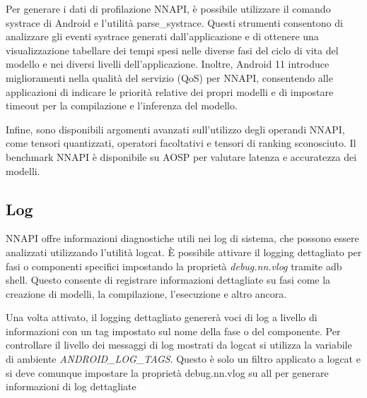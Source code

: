 Per generare i dati di profilazione NNAPI, è possibile utilizzare il comando systrace di Android e l'utilità parse\_systrace. Questi strumenti consentono di analizzare gli eventi systrace generati dall'applicazione e di ottenere
una visualizzazione tabellare dei tempi spesi nelle diverse fasi del ciclo di vita del modello e nei diversi livelli dell'applicazione.
Inoltre, Android 11 introduce miglioramenti nella qualità del servizio (QoS) per NNAPI, consentendo alle applicazioni di indicare le priorità relative dei propri modelli e di impostare timeout per la compilazione e l'inferenza del modello.

Infine, sono disponibili argomenti avanzati sull'utilizzo degli operandi NNAPI, come tensori quantizzati, operatori facoltativi e tensori di ranking sconosciuto. Il benchmark NNAPI è disponibile su AOSP per valutare latenza e accuratezza
dei modelli.

\subsection{Log}
NNAPI offre informazioni diagnostiche utili nei log di sistema, che possono essere analizzati utilizzando l'utilità logcat. È possibile attivare il logging dettagliato per fasi o componenti specifici impostando la proprietà
\textit{debug.nn.vlog} tramite adb shell. Questo consente di registrare informazioni dettagliate su fasi come la creazione di modelli, la compilazione, l'esecuzione e altro ancora.

Una volta attivato, il logging dettagliato genererà voci di log a livello di informazioni con un tag impostato sul nome della fase o del componente. Per controllare il livello dei messaggi di log mostrati da logcat si utilizza
la variabile di ambiente \textit{ANDROID\_LOG\_TAGS}. Questo è solo un filtro applicato a logcat e si deve comunque impostare la proprietà debug.nn.vlog su all per generare informazioni di log dettagliate

